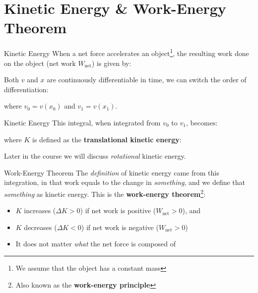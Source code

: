 \documentclass[12pt,compress,aspectratio=169]{beamer}
\begin{document}
\section{Kinetic Energy \& Work-Energy Theorem}

\begin{frame}{Kinetic Energy}
  When a net force accelerates an object\footnote{We assume that the object has
  a constant mass}, the resulting work done on the object (net work
  $W_\text{net}$) is given by:


  Both $v$ and $x$ are continuously differentiable in time, we can switch the
  order of differentiation:
  
  where $v_0=v(x_0)$ and $v_1=v(x_1)$.
  \vspace{.3in}
\end{frame}



\begin{frame}{Kinetic Energy}
  This integral, when integrated from $v_0$ to $v_1$, becomes:

  
  where $K$ is defined as the \textbf{translational kinetic energy}:


  Later in the course we will discuss \emph{rotational} kinetic energy.
\end{frame}



\begin{frame}{Work-Energy Theorem}
  The \emph{definition} of kinetic energy came from this integration, in that
  work equals to the change in \emph{something}, and we define that
  \emph{something} as kinetic energy. This is the
  \textbf{work-energy theorem}\footnote{Also known as the
  \textbf{work-energy principle}}:

  \begin{itemize}
  \item $K$ increases ($\Delta K>0$) if net work is positive ($W_\text{net}>0$),
    and
  \item $K$ decreases ($\Delta K<0$) if net work is negative ($W_\text{net}>0$)
  \item It does not matter \emph{what} the net force is composed of
  \end{itemize}
\end{frame}
\end{document}
